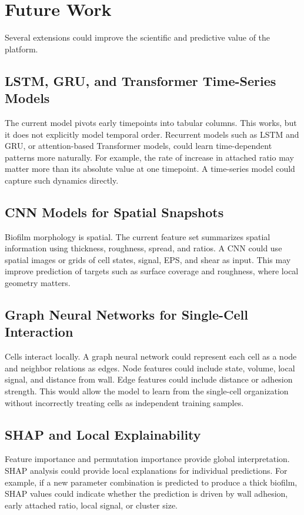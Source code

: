\documentclass[12pt,a4paper,oneside]{report}
\begin{document}
\chapter{Future Work}
Several extensions could improve the scientific and predictive value of the platform.

\section{LSTM, GRU, and Transformer Time-Series Models}
The current model pivots early timepoints into tabular columns. This works, but it does not explicitly model temporal order. Recurrent models such as LSTM and GRU, or attention-based Transformer models, could learn time-dependent patterns more naturally. For example, the rate of increase in attached ratio may matter more than its absolute value at one timepoint. A time-series model could capture such dynamics directly.

\section{CNN Models for Spatial Snapshots}
Biofilm morphology is spatial. The current feature set summarizes spatial information using thickness, roughness, spread, and ratios. A CNN could use spatial images or grids of cell states, signal, EPS, and shear as input. This may improve prediction of targets such as surface coverage and roughness, where local geometry matters.

\section{Graph Neural Networks for Single-Cell Interaction}
Cells interact locally. A graph neural network could represent each cell as a node and neighbor relations as edges. Node features could include state, volume, local signal, and distance from wall. Edge features could include distance or adhesion strength. This would allow the model to learn from the single-cell organization without incorrectly treating cells as independent training samples.

\section{SHAP and Local Explainability}
Feature importance and permutation importance provide global interpretation. SHAP analysis could provide local explanations for individual predictions. For example, if a new parameter combination is predicted to produce a thick biofilm, SHAP values could indicate whether the prediction is driven by wall adhesion, early attached ratio, local signal, or cluster size.
\end{document}
